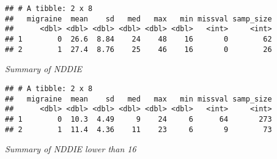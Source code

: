 \documentclass[]{article}
\newenvironment{Shaded}{\begin{snugshade}}{\end{snugshade}}
\newcommand{\KeywordTok}[1]{\textcolor[rgb]{0.13,0.29,0.53}{\textbf{#1}}}
\newcommand{\DataTypeTok}[1]{\textcolor[rgb]{0.13,0.29,0.53}{#1}}
\newcommand{\StringTok}[1]{\textcolor[rgb]{0.31,0.60,0.02}{#1}}
\newcommand{\OtherTok}[1]{\textcolor[rgb]{0.56,0.35,0.01}{#1}}
\newcommand{\OperatorTok}[1]{\textcolor[rgb]{0.81,0.36,0.00}{\textbf{#1}}}
\newcommand{\NormalTok}[1]{#1}
\begin{document}
\begin{verbatim}
## # A tibble: 2 x 8
##   migraine  mean    sd   med   max   min missval samp_size
##      <dbl> <dbl> <dbl> <dbl> <dbl> <dbl>   <int>     <int>
## 1        0  26.6  8.84    24    48    16       0        62
## 2        1  27.4  8.76    25    46    16       0        26
\end{verbatim}

\emph{Summary of NDDIE}

\begin{Shaded}
\end{Shaded}

\begin{verbatim}
## # A tibble: 2 x 8
##   migraine  mean    sd   med   max   min missval samp_size
##      <dbl> <dbl> <dbl> <dbl> <dbl> <dbl>   <int>     <int>
## 1        0  10.3  4.49     9    24     6      64       273
## 2        1  11.4  4.36    11    23     6       9        73
\end{verbatim}

\emph{Summary of NDDIE lower than 16}
\end{document}
